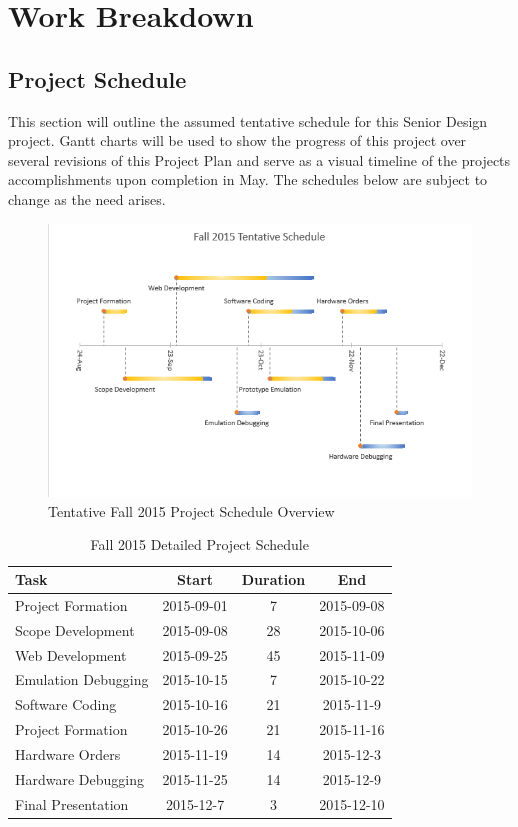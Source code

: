 \chapter{Work Breakdown}

\section{Project Schedule}


This section will outline the assumed tentative schedule for this Senior Design project. Gantt charts will be used to show the progress of this project over several revisions of this Project Plan and serve as a visual timeline of the projects accomplishments upon completion in May. The schedules below are subject to change as the need arises. 

\begin{figure}[!ht]
\centering
\includegraphics[scale=0.65]{./figures/fall-timeline}
\caption{Tentative Fall 2015 Project Schedule Overview}
\label{figure:fall-timeline}
\end{figure}

\begin{table}
\centering
\begin{tabular}{l  c  c  c}
Task & Start & Duration & End \\
\hline
Project Formation & 2015-09-01 & 7 & 2015-09-08 \\
Scope Development & 2015-09-08 & 28 & 2015-10-06 \\
Web Development & 2015-09-25 & 45 & 2015-11-09 \\
Emulation Debugging & 2015-10-15 & 7 & 2015-10-22 \\
Software Coding & 2015-10-16 & 21 & 2015-11-9 \\
Project Formation & 2015-10-26 & 21 & 2015-11-16 \\
Hardware Orders & 2015-11-19 & 14 & 2015-12-3 \\
Hardware Debugging & 2015-11-25 & 14 & 2015-12-9 \\
Final Presentation & 2015-12-7 & 3 & 2015-12-10 \\
\end{tabular}
\caption{Fall 2015 Detailed Project Schedule}
\label{table:risk}
\end{table}
\vspace{0.3cm}

